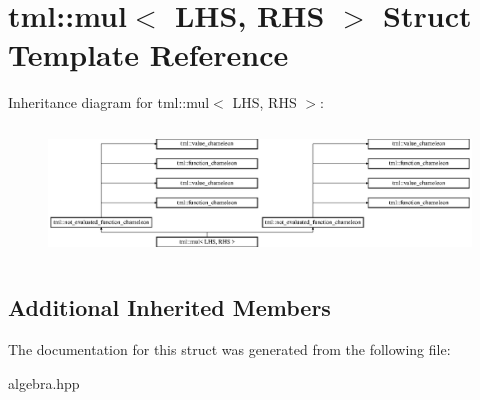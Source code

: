 \hypertarget{structtml_1_1mul}{\section{tml\+:\+:mul$<$ L\+H\+S, R\+H\+S $>$ Struct Template Reference}
\label{structtml_1_1mul}
}
Inheritance diagram for tml\+:\+:mul$<$ L\+H\+S, R\+H\+S $>$\+:\begin{figure}[H]
\begin{center}
\leavevmode
\includegraphics[height=3.500000cm]{structtml_1_1mul}
\end{center}
\end{figure}
\subsection*{Additional Inherited Members}


The documentation for this struct was generated from the following file\+:\begin{DoxyCompactItemize}
\item 
algebra.\+hpp\end{DoxyCompactItemize}
